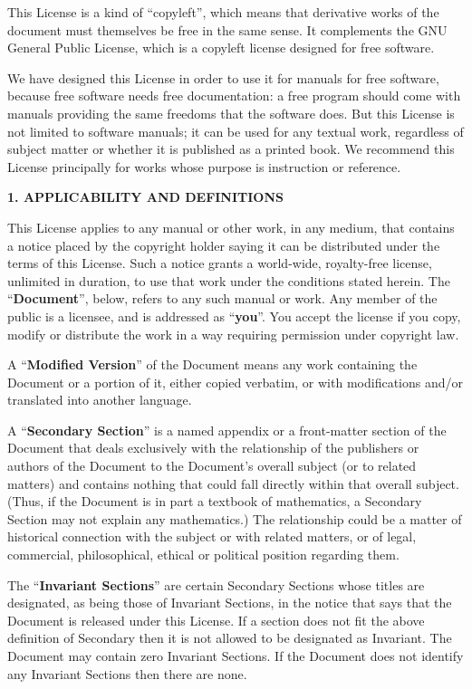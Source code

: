 \documentclass[11pt]{book}
\numberwithin{example}{chapter}
\begin{document}
This License is a kind of ``copyleft'', which means that derivative
works of the document must themselves be free in the same sense.  It
complements the GNU General Public License, which is a copyleft
license designed for free software.

We have designed this License in order to use it for manuals for free
software, because free software needs free documentation: a free
program should come with manuals providing the same freedoms that the
software does.  But this License is not limited to software manuals;
it can be used for any textual work, regardless of subject matter or
whether it is published as a printed book.  We recommend this License
principally for works whose purpose is instruction or reference.


\begin{center}
{\Large\bf 1. APPLICABILITY AND DEFINITIONS\par}
\end{center}

This License applies to any manual or other work, in any medium, that
contains a notice placed by the copyright holder saying it can be
distributed under the terms of this License.  Such a notice grants a
world-wide, royalty-free license, unlimited in duration, to use that
work under the conditions stated herein.  The ``\textbf{Document}'', below,
refers to any such manual or work.  Any member of the public is a
licensee, and is addressed as ``\textbf{you}''.  You accept the license if you
copy, modify or distribute the work in a way requiring permission
under copyright law.

A ``\textbf{Modified Version}'' of the Document means any work containing the
Document or a portion of it, either copied verbatim, or with
modifications and/or translated into another language.

A ``\textbf{Secondary Section}'' is a named appendix or a front-matter section of
the Document that deals exclusively with the relationship of the
publishers or authors of the Document to the Document's overall subject
(or to related matters) and contains nothing that could fall directly
within that overall subject.  (Thus, if the Document is in part a
textbook of mathematics, a Secondary Section may not explain any
mathematics.)  The relationship could be a matter of historical
connection with the subject or with related matters, or of legal,
commercial, philosophical, ethical or political position regarding
them.

The ``\textbf{Invariant Sections}'' are certain Secondary Sections whose titles
are designated, as being those of Invariant Sections, in the notice
that says that the Document is released under this License.  If a
section does not fit the above definition of Secondary then it is not
allowed to be designated as Invariant.  The Document may contain zero
Invariant Sections.  If the Document does not identify any Invariant
Sections then there are none.
\end{document}
